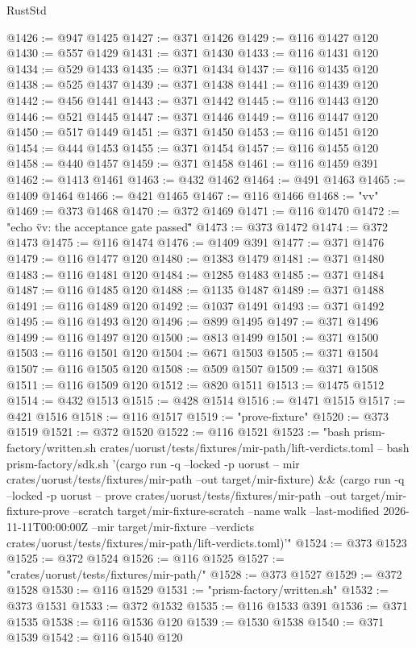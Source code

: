\begin{lexlean}{RustStd}
\begin{coremodule}
@1426 := @947 @1425
@1427 := @371 @1426
@1429 := @116 @1427 @120
@1430 := @557 @1429
@1431 := @371 @1430
@1433 := @116 @1431 @120
@1434 := @529 @1433
@1435 := @371 @1434
@1437 := @116 @1435 @120
@1438 := @525 @1437
@1439 := @371 @1438
@1441 := @116 @1439 @120
@1442 := @456 @1441
@1443 := @371 @1442
@1445 := @116 @1443 @120
@1446 := @521 @1445
@1447 := @371 @1446
@1449 := @116 @1447 @120
@1450 := @517 @1449
@1451 := @371 @1450
@1453 := @116 @1451 @120
@1454 := @444 @1453
@1455 := @371 @1454
@1457 := @116 @1455 @120
@1458 := @440 @1457
@1459 := @371 @1458
@1461 := @116 @1459 @391
@1462 := @1413 @1461
@1463 := @432 @1462
@1464 := @491 @1463
@1465 := @1409 @1464
@1466 := @421 @1465
@1467 := @116 @1466
@1468 := "vv"
@1469 := @373 @1468
@1470 := @372 @1469
@1471 := @116 @1470
@1472 := "echo \"vv: the acceptance gate passed\""
@1473 := @373 @1472
@1474 := @372 @1473
@1475 := @116 @1474
@1476 := @1409 @391
@1477 := @371 @1476
@1479 := @116 @1477 @120
@1480 := @1383 @1479
@1481 := @371 @1480
@1483 := @116 @1481 @120
@1484 := @1285 @1483
@1485 := @371 @1484
@1487 := @116 @1485 @120
@1488 := @1135 @1487
@1489 := @371 @1488
@1491 := @116 @1489 @120
@1492 := @1037 @1491
@1493 := @371 @1492
@1495 := @116 @1493 @120
@1496 := @899 @1495
@1497 := @371 @1496
@1499 := @116 @1497 @120
@1500 := @813 @1499
@1501 := @371 @1500
@1503 := @116 @1501 @120
@1504 := @671 @1503
@1505 := @371 @1504
@1507 := @116 @1505 @120
@1508 := @509 @1507
@1509 := @371 @1508
@1511 := @116 @1509 @120
@1512 := @820 @1511
@1513 := @1475 @1512
@1514 := @432 @1513
@1515 := @428 @1514
@1516 := @1471 @1515
@1517 := @421 @1516
@1518 := @116 @1517
@1519 := "prove-fixture"
@1520 := @373 @1519
@1521 := @372 @1520
@1522 := @116 @1521
@1523 := "bash prism-factory/written.sh crates/uorust/tests/fixtures/mir-path/lift-verdicts.toml -- bash prism-factory/sdk.sh '(cargo run -q --locked -p uorust -- mir crates/uorust/tests/fixtures/mir-path --out target/mir-fixture) && (cargo run -q --locked -p uorust -- prove crates/uorust/tests/fixtures/mir-path --out target/mir-fixture-prove --scratch target/mir-fixture-scratch --name walk --last-modified 2026-11-11T00:00:00Z --mir target/mir-fixture --verdicts crates/uorust/tests/fixtures/mir-path/lift-verdicts.toml)'"
@1524 := @373 @1523
@1525 := @372 @1524
@1526 := @116 @1525
@1527 := "crates/uorust/tests/fixtures/mir-path/"
@1528 := @373 @1527
@1529 := @372 @1528
@1530 := @116 @1529
@1531 := "prism-factory/written.sh"
@1532 := @373 @1531
@1533 := @372 @1532
@1535 := @116 @1533 @391
@1536 := @371 @1535
@1538 := @116 @1536 @120
@1539 := @1530 @1538
@1540 := @371 @1539
@1542 := @116 @1540 @120

\end{coremodule}
\end{lexlean}
